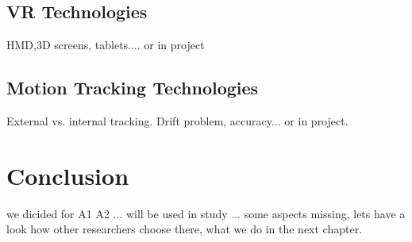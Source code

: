 \subsection{VR Technologies}
HMD,3D screens, tablets.... \todo or in project

\subsection{Motion Tracking Technologies}
External vs. internal tracking. Drift problem, accuracy... \todo or in project.



\section{Conclusion}
we dicided for A1 A2 ... will be used in study ... some aspects missing, lets have a look how other researchers choose there, what we do in the next chapter.